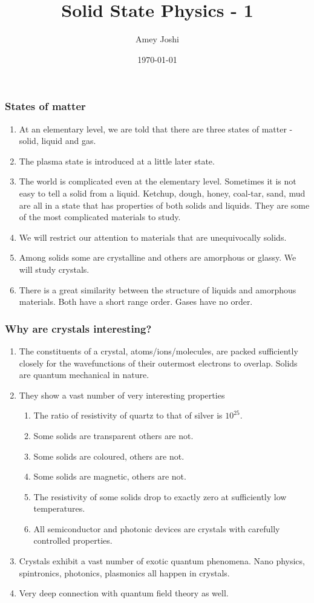 \documentclass{beamer}
\title{Solid State Physics - 1}
\author{Amey Joshi}
\date{\today}
\begin{document}
\begin{frame}
\titlepage
\end{frame}

\begin{frame}
\frametitle{States of matter}
\begin{enumerate}
\item At an elementary level, we are told that there are three states of matter
- solid, liquid and gas.
\item The plasma state is introduced at a little later state.
\item The world is complicated even at the elementary level. Sometimes it is not
easy to tell a solid from a liquid. Ketchup, dough, honey, coal-tar, sand, mud 
are all in a state that has properties of both solids and liquids. They are some 
of the most complicated materials to study.
\item We will restrict our attention to materials that are unequivocally solids.
\item Among solids some are crystalline and others are amorphous or glassy. We
will study crystals.
\item There is a great similarity between the structure of liquids and amorphous
materials. Both have a short range order. Gases have no order.
\end{enumerate}
\end{frame}

\begin{frame}
\frametitle{Why are crystals interesting?}
\begin{enumerate}
\item The constituents of a crystal, atoms/ions/molecules, are packed 
sufficiently closely for the wavefunctions of their outermost electrons to 
overlap. Solids are quantum mechanical in nature.
\item They show a vast number of very interesting properties
\begin{enumerate}
\item The ratio of resistivity of quartz to that of silver is $10^{25}$.
\item Some solids are transparent others are not.
\item Some solids are coloured, others are not.
\item Some solids are magnetic, others are not.
\item The resistivity of some solids drop to exactly zero at sufficiently low
temperatures.
\item All semiconductor and photonic devices are crystals with carefully 
controlled properties.
\end{enumerate}
\item Crystals exhibit a vast number of exotic quantum phenomena. Nano physics, 
spintronics, photonics, plasmonics all happen in crystals.
\item Very deep connection with quantum field theory as well.
\end{enumerate}
\end{frame}
\end{document}
